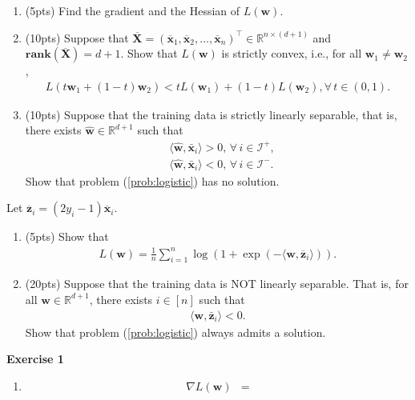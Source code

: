 \documentclass[11pt,letter,notitlepage]{article}
\newcommand{\rank}[1]{ \textbf{rank}  (#1)  }
\begin{document}
\begin{exercise}
    \begin{enumerate}
    	\item (5pts) Find the gradient and the Hessian of $L(\textbf{w})$.
    	\item (10pts) Suppose that $\overline{\textbf{X}}=(\overline{\mathbf{x}}_1,\overline{\mathbf{x}}_2,\dots,\overline{\mathbf{x}}_n)^\top\in\mathbb{R}^{n \times (d+1)}$ and $\rank{\overline{\mathbf{X}}}=d+1$. Show that $L(\textbf{w})$ is strictly convex, i.e., for all $\textbf{w}_1\neq \textbf{w}_2$,
    	\begin{align*}
    	    L(t\textbf{w}_1 + (1-t)\textbf{w}_2) < t L(\textbf{w}_1)+(1-t)L(\textbf{w}_2),\forall\, t \in (0,1).
    	\end{align*}
    	\item (10pts) Suppose that the training data is strictly linearly separable, that is, there exists $\hat{\mathbf{w}}\in\mathbb{R}^{d+1}$ such that
    	\begin{align*}
    	    &\langle \hat{\mathbf{w}}, \mathbf{\bar{x}}_i\rangle>0,\,\forall\,i\in\mathcal{I}^+,\\
    	    &\langle \hat{\mathbf{w}}, \mathbf{\bar{x}}_i\rangle<0,\,\forall\,i\in\mathcal{I}^-.
    	\end{align*}
    	Show that problem (\ref{prob:logistic}) has no solution.
    \end{enumerate}
	Let $\overline{\mathbf{z}}_i = (2 y_i-1)\overline{\mathbf{x}}_i$. 
    \begin{enumerate}[resume]
        \item (5pts) Show that
        \begin{align*}
            L(\textbf{w}) = \frac{1}{n} \sum_{i=1}^n \log(1+\exp(-\langle \mathbf{w},\overline{\mathbf{z}}_i \rangle)).
        \end{align*}
    	\item (20pts) Suppose that the training data is NOT linearly separable. That is, for all $\mathbf{w} \in \mathbb{R}^{d+1}$, there exists $ i \in \left[ n \right] $ such that
    	\begin{align*}
    	    \langle \mathbf{w}, \mathbf{\bar{z}}_i\rangle<0.
    	\end{align*}
    	Show that problem (\ref{prob:logistic}) always admits a solution.
    \end{enumerate}
\end{exercise}

\begin{solution}
	\textbf{Exercise 1}
	\begin{enumerate}
		\item
		\begin{align*}
			\nabla L(\mathbf{w})&=
		\end{align*}
	\end{enumerate}
\end{solution}
\end{document}
